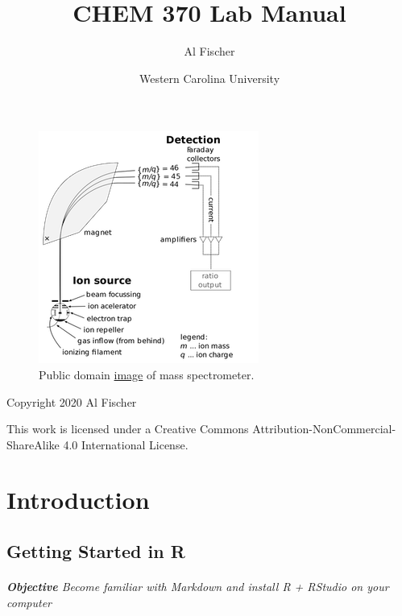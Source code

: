 \documentclass[]{tufte-book}
\title{CHEM 370 Lab Manual}
\author{Al Fischer}
\date{Western Carolina University}
\begin{document}
\maketitle



{
\hypersetup{linkcolor=black}
\setcounter{tocdepth}{1}
\tableofcontents
}

\hypertarget{section}{%
\chapter*{}\label{section}}

\begin{figure}
\centering
\includegraphics{images/cover-image-mass-spec.png}
\caption{Public domain \href{https://commons.wikimedia.org/wiki/File:Mass_Spectrometer_Schematic.svg\#/media/File:Mass_Spectrometer_Schematic.svg}{image} of mass spectrometer.}
\end{figure}

Copyright 2020 Al Fischer

This work is licensed under a Creative Commons Attribution-NonCommercial-ShareAlike 4.0 International License.

\hypertarget{part-introduction}{%
\part{Introduction}\label{part-introduction}}

\hypertarget{getting-started-in-r}{%
\chapter{Getting Started in R}\label{getting-started-in-r}}

\hypertarget{objective-become-familiar-with-markdown-and-install-r-rstudio-on-your-computer}{%
\paragraph{\texorpdfstring{\textbf{Objective} \textbar{} Become familiar with Markdown and install R + RStudio on your computer}{Objective \textbar{} Become familiar with Markdown and install R + RStudio on your computer}}\label{objective-become-familiar-with-markdown-and-install-r-rstudio-on-your-computer}}
\end{document}
